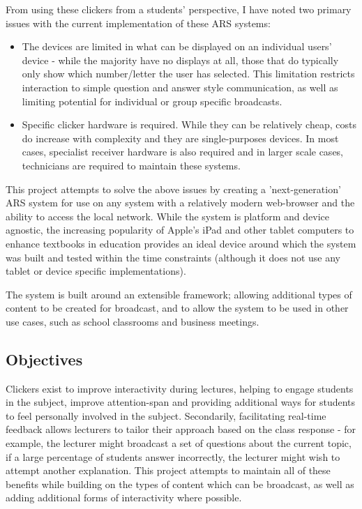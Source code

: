 \documentclass[a4papert,11pt,notitlepage]{ltxdoc}
\begin{document}
From using these clickers from a students' perspective, I have noted two primary issues with the current implementation of these ARS systems:
\begin{itemize}
\item The devices are limited in what can be displayed on an individual users' device - while the majority have no displays at all, those that do typically only show which number/letter the user has selected. This limitation restricts interaction to simple question and answer style communication, as well as limiting potential for individual or group specific broadcasts.
\item Specific clicker hardware is required. While they can be relatively cheap, costs do increase with complexity and they are single-purposes devices. In most cases, specialist receiver hardware is also required and in larger scale cases, technicians are required to maintain these systems.
\end{itemize}

This project attempts to solve the above issues by creating a 'next-generation' ARS system for use on any system with a relatively modern web-browser and the ability to access the local network. While the system is platform and device agnostic, the increasing popularity of Apple's iPad and other tablet computers to enhance textbooks in education provides an ideal device around which the system was built and tested within the time constraints (although it does not use any tablet or device specific implementations).

The system is built around an extensible framework; allowing additional types of content to be created for broadcast, and to allow the system to be used in other use cases, such as school classrooms and business meetings. 

\subsection{Objectives}
Clickers exist to improve interactivity during lectures, helping to engage students in the subject, improve attention-span and providing additional ways for students to feel personally involved in the subject. Secondarily, facilitating real-time feedback allows lecturers to tailor their approach based on the class response - for example, the lecturer might broadcast a set of questions about the current topic, if a large percentage of students answer incorrectly, the lecturer might wish to attempt another explanation. This project attempts to maintain all of these benefits while building on the types of content which can be broadcast, as well as adding additional forms of interactivity where possible.
\end{document}
